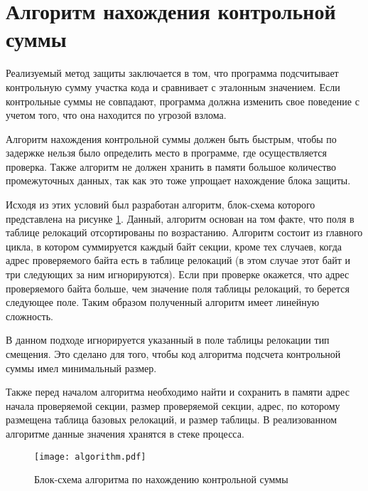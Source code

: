 
\section{Алгоритм нахождения контрольной суммы}

Реализуемый метод защиты заключается в том, что программа подсчитывает
контрольную сумму участка кода и сравнивает с эталонным значением. Если
контрольные суммы не совпадают, программа должна изменить свое поведение с
учетом того, что она находится по угрозой взлома.

Алгоритм нахождения контрольной суммы должен быть быстрым, чтобы по задержке
нельзя было определить место в программе, где осуществляется проверка. Также
алгоритм не должен хранить в памяти большое количество промежуточных данных, так
как это тоже упрощает нахождение блока защиты.

Исходя из этих условий был разработан алгоритм, блок-схема которого представлена
на рисунке \ref{fig:algorithm}. Данный, алгоритм основан на том факте, что поля
в таблице релокаций отсортированы по возрастанию. Алгоритм состоит из главного
цикла, в котором суммируется каждый байт секции, кроме тех случаев, когда адрес
проверяемого байта есть в таблице релокаций (в этом случае этот байт и три
следующих за ним игнорируются). Если при проверке окажется, что адрес
проверяемого байта больше, чем значение поля таблицы релокаций, то берется
следующее поле. Таким образом полученный алгоритм имеет линейную сложность.

В данном подходе игнорируется указанный в поле таблицы релокации тип смещения.
Это сделано для того, чтобы код алгоритма подсчета контрольной суммы имел
минимальный размер. 

Также перед началом алгоритма необходимо найти и сохранить в памяти адрес начала
проверяемой секции, размер проверяемой секции, адрес, по которому размещена
таблица базовых релокаций, и размер таблицы. В реализованном алгоритме данные
значения хранятся в стеке процесса.

\begin{figure}[h!]
  \centering
  \texttt{[image: algorithm.pdf]}
  \caption{Блок-схема алгоритма по нахождению контрольной суммы}
  \label{fig:algorithm}
\end{figure}

\clearpage
